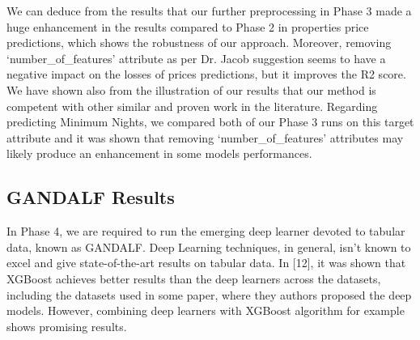 \documentclass[a4paper,12pt]{article}
\begin{document}
\begin{table}[h!]
    \centering
    \caption{df-Analyze Results of Predicting Minimum Nights}
    \label{tab:df_analyze_predicting_nights}
\end{table}

We can deduce from the results that our further preprocessing in Phase 3 made a huge enhancement in the results compared to Phase 2 in properties price predictions, which shows the robustness of our approach. Moreover, removing `number\_of\_features' attribute as per Dr. Jacob suggestion seems to have a negative impact on the losses of prices predictions, but it improves the R2 score. We have shown also from the illustration of our results that our method is competent with other similar and proven work in the literature. Regarding predicting Minimum Nights, we compared both of our Phase 3 runs on this target attribute and it was shown that removing `number\_of\_features' attributes may likely produce an enhancement in some models performances.

\subsection*{GANDALF Results}

In Phase 4, we are required to run the emerging deep learner devoted to tabular data, known as GANDALF. Deep Learning techniques, in general, isn't known to excel and give state-of-the-art results on tabular data. In [12], it was shown that XGBoost achieves better results than the deep learners across the datasets, including the datasets used in some paper, where they authors proposed the deep models. However, combining deep learners with XGBoost algorithm for example shows promising results.
\end{document}
